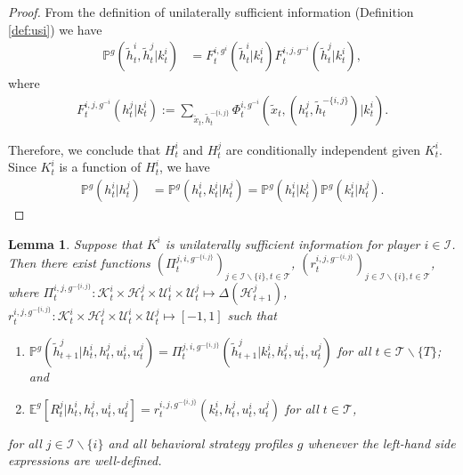 \documentclass[pdflatex,sn-basic]{sn-jnl}
\newcommand{\E}{\mathbb{E}}
\renewcommand{\Pr}{\mathbb{P}}
\newcommand{\Comp}{K}
\newcommand{\comp}{k}
\newcommand{\Compset}{\mathcal{K}}
\theoremstyle{thmstyleone}%
\newtheorem{lemma}{Lemma}
\theoremstyle{thmstyletwo}%
\theoremstyle{thmstylethree}%
\begin{document}
\begin{appendices}
\begin{proof}
	From the definition of unilaterally sufficient information (Definition \ref{def:usi}) we have 
	\begin{align}
		\Pr^{g}(\tilde{h}_t^i, \tilde{h}_t^j|\comp_t^i) &= F_t^{i, g^i}(\tilde{h}_t^i|\comp_t^i) F_t^{i,j, g^{-i}}(\tilde{h}_t^j|\comp_t^i), 
	\end{align}
	where
	\begin{align}
		F_t^{i,j, g^{-i}}(h_t^j|\comp_t^i) := \sum_{\tilde{x}_t, \tilde{h}_t^{-\{i, j\} }}\Phi_t^{i,g^{-i}}(\tilde{x}_t, (h_t^j, \tilde{h}_t^{-\{i, j\}})|\comp_t^i).
	\end{align}

	Therefore, we conclude that $H_t^i$ and $H_t^j$ are conditionally independent given $\Comp_t^i$. Since $\Comp_t^i$ is a function of $H_t^i$, we have
	\begin{align}
		\Pr^g(h_t^i|h_t^j) &= \Pr^g(h_t^i, \comp_t^i|h_t^j) =\Pr^{g}(h_t^i|\comp_t^i)\Pr^g(\comp_t^i|h_t^j).
	\end{align}
\end{proof}


\begin{lemma}\label{lem:usisatisoldconds}
 	Suppose that $\Comp^i$ is unilaterally sufficient information for player $i\in\mathcal{I}$. Then there exist functions $(\Pi_t^{j,i,g^{-\{i,j\}}})_{j\in\mathcal{I}\backslash\{i\},t\in\mathcal{T}}$, $(r_t^{i, j,g^{-\{i, j\}}})_{j\in\mathcal{I}\backslash\{i\}, t\in\mathcal{T}}$, where $\Pi_t^{i,j,g^{-\{i, j\}}}: \Compset_t^i\times \mathcal{H}_t^j \times \mathcal{U}_t^i \times \mathcal{U}_t^j \mapsto \Delta(\mathcal{H}_{t+1}^j)$, $r_t^{i,j,g^{-\{i,j\}}}: \Compset_t^i\times \mathcal{H}_t^j  \times \mathcal{U}_t^i \times \mathcal{U}_t^j \mapsto [-1, 1]$ such that
	\begin{enumerate}[(1)]
		\item $\Pr^{g}(\tilde{h}_{t+1}^j|h_t^i, h_t^j, u_t^i, u_t^j) = \Pi_t^{j, i, g^{-\{i, j\}}}(\tilde{h}_{t+1}^j|\comp_t^i, h_t^j, u_t^i, u_t^j)$ for all $t\in\mathcal{T}\backslash\{T\}$; and
		\item $\E^{g}[R_t^j|h_t^i, h_t^j, u_t^i, u_t^j] = r_t^{i, j, g^{-\{i, j\}}}(\comp_t^i, h_t^j, u_t^i, u_t^j)$ for all $t\in \mathcal{T}$,
		
	\end{enumerate}
	for all $j\in\mathcal{I}\backslash\{i\}$ and all behavioral strategy profiles $g$ whenever the left-hand side expressions are well-defined.
\end{lemma}


\end{appendices}
\end{document}
